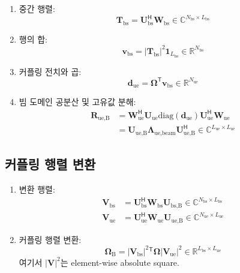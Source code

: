 \documentclass[10pt]{article}
\begin{document}
\begin{enumerate}
\item 중간 행렬:
\begin{equation}
\mathbf{T}_{\text{bs}} = \mathbf{U}_{\text{bs}}^{\mathsf{H}} \mathbf{W}_{\text{bs}} \in \mathbb{C}^{N_{\text{bs}} \times L_{\text{bs}}}
\end{equation}

\item 행의 합:
\begin{equation}
\mathbf{v}_{\text{bs}} = |\mathbf{T}_{\text{bs}}|^2 \mathbf{1}_{L_{\text{bs}}} \in \mathbb{R}^{N_{\text{bs}}}
\end{equation}

\item 커플링 전치와 곱:
\begin{equation}
\mathbf{d}_{\text{ue}} = \boldsymbol{\Omega}^{\mathsf{T}} \mathbf{v}_{\text{bs}} \in \mathbb{R}^{N_{\text{ue}}}
\end{equation}

\item 빔 도메인 공분산 및 고유값 분해:
\begin{align}
\mathbf{R}_{\text{ue,B}} 
&= \mathbf{W}_{\text{ue}}^{\mathsf{H}} \mathbf{U}_{\text{ue}} \text{diag}(\mathbf{d}_{\text{ue}}) \mathbf{U}_{\text{ue}}^{\mathsf{H}} \mathbf{W}_{\text{ue}}  \\
&= \mathbf{U}_{\text{ue,B}} \mathbf{\Lambda}_{\text{ue,beam}} \mathbf{U}_{\text{ue,B}}^{\mathsf{H}} \in \mathbb{C}^{L_{\text{ue}} \times L_{\text{ue}}}
\end{align}
\end{enumerate}

\subsection{커플링 행렬 변환}

\begin{enumerate}
\item 변환 행렬:
\begin{align}
\mathbf{V}_{\text{bs}} &= \mathbf{U}_{\text{bs}}^{\mathsf{H}} \mathbf{W}_{\text{bs}} \mathbf{U}_{\text{bs,B}} \in \mathbb{C}^{N_{\text{bs}} \times L_{\text{bs}}} \\
\mathbf{V}_{\text{ue}} &= \mathbf{U}_{\text{ue}}^{\mathsf{H}} \mathbf{W}_{\text{ue}} \mathbf{U}_{\text{ue,B}} \in \mathbb{C}^{N_{\text{ue}} \times L_{\text{ue}}}
\end{align}

\item 커플링 행렬 변환:
\begin{equation}
\boldsymbol{\Omega}_{\text{B}} = |\mathbf{V}_{\text{bs}}|^2{}^{\mathsf{T}} \boldsymbol{\Omega} |\mathbf{V}_{\text{ue}}|^2 \in \mathbb{R}^{L_{\text{bs}} \times L_{\text{ue}}}
\end{equation}
여기서 $|\mathbf{V}|^2$는 element-wise absolute square.
\end{enumerate}
\end{document}
